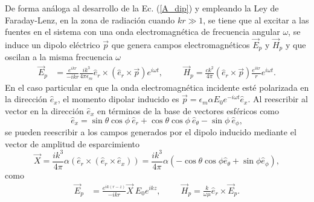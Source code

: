  De forma análoga al desarrollo de la Ec. (\ref{A_dip}) y empleando la Ley de Faraday-Lenz, en la zona de radiación cuando $kr\gg 1$, se tiene que al excitar a las fuentes en el sistema con una onda electromagnética de frecuencia angular $\omega$, se induce un dipolo eléctrico $\Vec{p}$ que genera campos electromagnéticos $\Vec{E}_p$ y $\Vec{H}_p$ y  que oscilan a la misma frecuencia $\omega$ 
\begin{align}
    \Vec{E}_p&=\frac{e^{ikr}}{-ikr}\frac{ik^3}{4\pi\epsilon_m}\hat{e}_r\times(\hat{e}_r\times \Vec{p}) e^{i\omega t}, \hspace{1cm}
    \Vec{H}_p=\frac{ck^2}{4\pi}(\hat{e}_r\times\Vec{p})\frac{e^{ikr}}{r}e^{i\omega t}.
\end{align}
En el caso particular en que la onda electromagnética incidente esté polarizada en la dirección $\hat{e}_x$, el momento dipolar inducido es $\Vec{p}=\epsilon_m \alpha E_0 e^{-i\omega t}\hat{e}_x$. Al reescribir al vector en la dirección $\hat{e}_x$ en términos de la base de vectores esféricos como \cite{Griffiths}
\begin{equation}
	\hat{e}_x=\sin\theta\cos\phi\: \hat{e}_r+\cos\theta\cos\phi\: \hat{e}_{\theta}-\sin\phi \:\hat{e}_{\phi},
\end{equation}
se pueden reescribir a los campos generados por el dipolo inducido mediante el vector de amplitud de esparcimiento
\begin{equation}
	\Vec{X}=\frac{ik^3}{4\pi}\alpha \left( \hat{e}_r\times(\hat{e}_r\times \hat{e}_x)\right)=\frac{ik^3}{4\pi}\alpha \left(-\cos\theta\cos\phi \hat{e}_{\theta}+\sin\phi \hat{e}_{\phi} \right),
	\label{Xvec}
\end{equation}
como
 \begin{align}
 	\Vec{E}_{p}&=\frac{e^{ik(r-z)}}{-ikr}\Vec{X}\:E_0 e^{ikz},
 	\hspace{1cm}
 	\Vec{H}_{p}=\frac{k}{\omega\mu}\hat{e}_r\times\Vec{E}_{p}.
 	\label{EH_s}
 \end{align}

